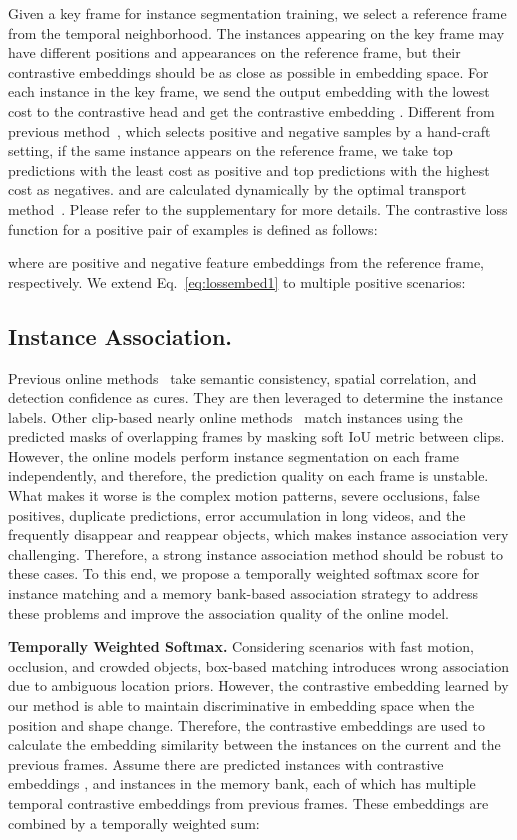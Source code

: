 \documentclass[runningheads]{llncs}
\begin{document}
Given a key frame for instance segmentation training, we select a reference frame from the temporal neighborhood. The instances appearing on the key frame may have different positions and appearances on the reference frame, but their contrastive embeddings should be as close as possible in embedding space.
For each instance in the key frame, we send the output embedding with the lowest cost to the contrastive head and get the contrastive embedding . 
Different from previous method~\cite{QDTrack}, which selects positive and negative samples by a hand-craft setting, if the same instance appears on the reference frame, we take top  predictions with the least cost as positive and top  predictions with the highest cost as negatives.  and  are calculated dynamically by the optimal transport method~\cite{OTA,yolox}.
Please refer to the supplementary for more details.
The contrastive loss function for a positive pair of examples is defined as follows:

where    are positive and negative feature embeddings from the reference frame, respectively.
We extend Eq.~\ref{eq:lossembed1} to multiple positive scenarios:



\subsection{Instance Association.}
\label{sec:InstAssociation}
Previous online methods~\cite{MaskTrackRCNN,CrossVIS} take semantic consistency, spatial correlation, and detection confidence as cures. They are then leveraged to determine the instance labels. Other clip-based nearly online methods~\cite{MaskProp,STEmSEG,IFC} match instances using the predicted masks of overlapping frames by masking soft IoU metric between clips.
However, the online models perform instance segmentation on each frame independently, and therefore, the prediction quality on each frame is unstable. What makes it worse is the complex motion patterns, severe occlusions, false positives, duplicate predictions, error accumulation in long videos, and the frequently disappear and reappear objects, which makes instance association very challenging. Therefore, a strong instance association method should be robust to these cases. To this end, we propose a temporally weighted softmax score for instance matching and a memory bank-based association strategy to address these problems and improve the association quality of the online model.

\noindent\textbf{Temporally Weighted Softmax.}
Considering scenarios with fast motion, occlusion, and crowded objects, box-based matching introduces wrong association due to ambiguous location priors. However, the contrastive embedding learned by our method is able to maintain discriminative in embedding space when the position and shape change.
Therefore, the contrastive embeddings are used to calculate the embedding similarity between the instances on the current and the previous frames.
Assume there are  predicted instances with  contrastive embeddings , and  instances in the memory bank, each of which has multiple temporal contrastive embeddings  from previous  frames.
These embeddings are combined by a temporally weighted sum:
\end{document}
